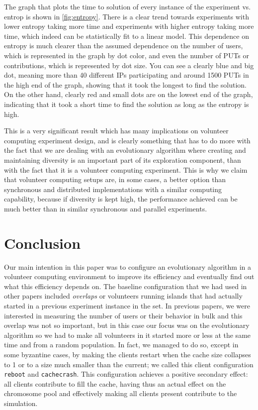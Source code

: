 \documentclass[runningheads,a4paper]{llncs}\usepackage[]{graphicx}\usepackage[]{color}
\begin{document}
The graph that plots the time to solution of every instance of the
experiment vs. entrop is shown in \ref{fig:entropy}. There is a clear
trend towards experiments with lower entropy taking more time and
experiments with higher entropy taking more time, which indeed can be
statistically fit to a linear model. This dependence on entropy is
much clearer than the assumed dependence on the number of users, which
is represented in the graph by dot color, and even the number of PUTs
or contributions, which is represented by dot size. You can see a
clearly blue and big dot, meaning more than 40 different IPs
participating and around 1500 PUTs in the high end of the graph,
showing that it took the longest to find the solution. On the other
hand, clearly red and small dots are on the lowest end of the graph,
indicating that it took a short time to find the solution as long as
the entropy is high. 

This is a very significant result which has many implications on
volunteer computing experiment design, and is clearly something that
has to do more with the fact that we are dealing with an evolutionary
algorithm where creating and maintaining diversity is an important
part of its exploration component, than with the fact that it is a
volunteer computing experiment. This is why we claim that volunteer
computing setups are, in some cases, a better option than synchronous
and distributed implementations with a similar computing capability,
because if diversity is kept high, the performance achieved can be
much better than in similar synchronous and parallel experiments. 


\section{Conclusion}
\label{sec:conclusion}

Our main intention in this paper was to configure an evolutionary
algorithm in a volunteer computing environment to improve its
efficiency and eventually find out what this efficiency depends
on. The baseline configuration that we had used in other papers  included
{\em overlaps} or volunteers running islands that had actually started in
a previous experiment instance in the set. In previous papers, we were
interested in measuring the number of users or their behavior in bulk
and this overlap was not so important, but
in this case our focus was on the evolutionary algorithm so we had to
make all volunteers in it started more or less at the same time and
from a random population. In fact, we managed to do so, except in some
byzantine cases, by making the clients restart when the cache size
collapses to 1 or to a size much smaller than the current; we called
this client configuration {\tt reboot} and {\tt cachecrash}.  This
configuration achieves a positive secondary effect: all clients
contribute to fill the cache, having thus an actual effect on the
chromosome pool and effectively making all clients present contribute
to the simulation. 
\end{document}
